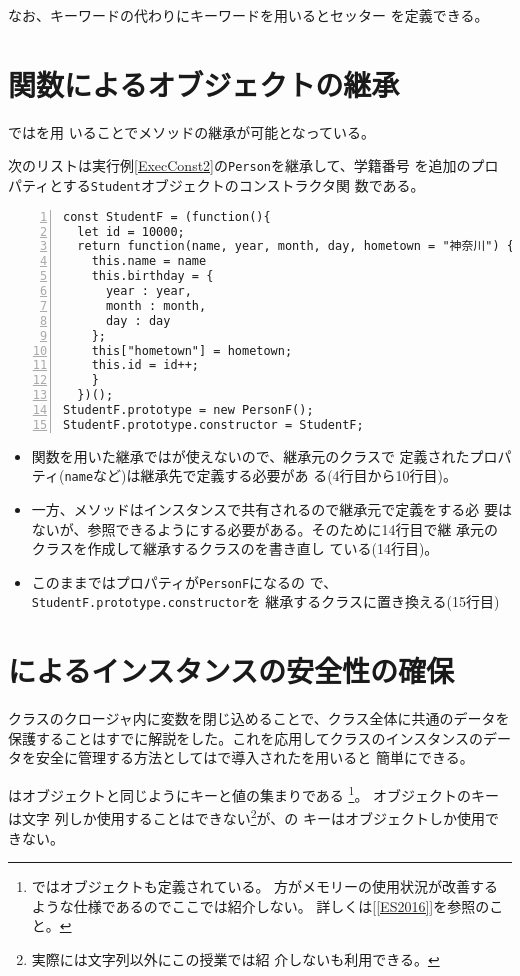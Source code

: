 なお、キーワードの代わりにキーワードを用いるとセッター
を定義できる。

\section{関数によるオブジェクトの継承}
\JS ではを用
いることでメソッドの継承が可能となっている。
\begin{Exec}\upshape\label{Execconst4}
次のリストは実行例\ref{ExecConst2}の\texttt{Person}を継承して、学籍番号
 を追加のプロパティとする\texttt{Student}オブジェクトのコンストラクタ関
 数である。
\begin{Verbatim}[numbers=left]
const StudentF = (function(){
  let id = 10000;
  return function(name, year, month, day, hometown = "神奈川") {
    this.name = name
    this.birthday = {
      year : year,
      month : month,
      day : day
    };
    this["hometown"] = hometown;
    this.id = id++;
    }
  })();
StudentF.prototype = new PersonF();
StudentF.prototype.constructor = StudentF;
\end{Verbatim}
\end{Exec}
\begin{itemize}
 \item 関数を用いた継承ではが使えないので、継承元のクラスで
       定義されたプロパティ(\texttt{name}など)は継承先で定義する必要があ
       る(4行目から10行目)。
 \item 一方、メソッドはインスタンスで共有されるので継承元で定義をする必
       要はないが、参照できるようにする必要がある。そのために14行目で継
       承元のクラスを作成して継承するクラスのを書き直し
       ている(14行目)。
 \item このままではプロパティが\texttt{PersonF}になるの
       で、\texttt{StudentF.prototype.constructor}を
       継承するクラスに置き換える(15行目)
\end{itemize}
\section{\protect{}によるインスタンスの安全性の確保}
\label{SaftyForInstance}
クラスのクロージャ内に変数を閉じ込めることで、クラス全体に共通のデータを
保護することはすでに解説をした。これを応用してクラスのインスタンスのデー
タを安全に管理する方法としては\ES で導入されたを用いると
簡単にできる。

はオブジェクトと同じようにキーと値の集まりである%
\footnote{\ES ではオブジェクトも定義されている。
方がメモリーの使用状況が改善するような仕様であるのでここでは紹介しない。
詳しくは[\ref{ES2016}]を参照のこと。}。
オブジェクトのキーは文字
列しか使用することはできない\footnote{実際には文字列以外にこの授業では紹
介しないも利用できる。}が、の
キーはオブジェクトしか使用できない。

